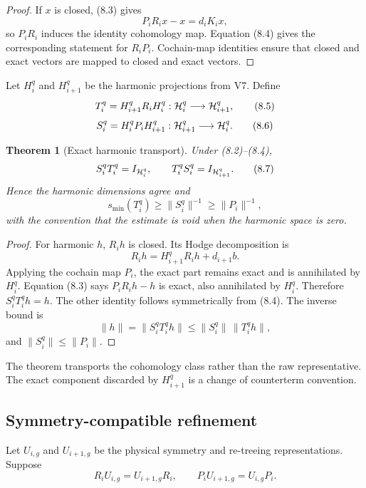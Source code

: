 \documentclass[11pt]{article}
\newtheorem{theorem}{Theorem}[section]
\theoremstyle{remark}
\begin{document}
\begin{proof}
If \(x\) is closed, (8.3) gives
\[
                              P_iR_ix-x=d_iK_ix,
\]
so \(P_iR_i\) induces the identity cohomology map.  Equation (8.4)
gives the corresponding statement for \(R_iP_i\).  Cochain-map
identities ensure that closed and exact vectors are mapped to closed
and exact vectors.
\end{proof}

Let \(H_i^q\) and \(H_{i+1}^q\) be the harmonic projections from V7.
Define
\[
 T_i^q=H_{i+1}^qR_iH_i^q:
       {\cal H}_i^q\longrightarrow{\cal H}_{i+1}^q,          \tag{8.5}
\]
\[
 S_i^q=H_i^qP_iH_{i+1}^q:
       {\cal H}_{i+1}^q\longrightarrow{\cal H}_i^q.          \tag{8.6}
\]

\begin{theorem}[Exact harmonic transport]
\label{thm:v12v8-harmonic}
Under (8.2)--(8.4),
\[
                              S_i^qT_i^q=I_{{\cal H}_i^q},
 \qquad
                              T_i^qS_i^q=I_{{\cal H}_{i+1}^q}.\tag{8.7}
\]
Hence the harmonic dimensions agree and
\[
                  s_{\min}(T_i^q)\ge\|S_i^q\|^{-1}
                                      \ge\|P_i\|^{-1},       \tag{8.8}
\]
with the convention that the estimate is void when the harmonic
space is zero.
\end{theorem}

\begin{proof}
For harmonic \(h\), \(R_ih\) is closed.  Its Hodge decomposition is
\[
                              R_ih=H_{i+1}^qR_ih+d_{i+1}b.
\]
Applying the cochain map \(P_i\), the exact part remains exact and is
annihilated by \(H_i^q\).  Equation (8.3) says
\(P_iR_ih-h\) is exact, also annihilated by \(H_i^q\).  Therefore
\(S_i^qT_i^qh=h\).  The other identity follows symmetrically from
(8.4).  The inverse bound is
\[
 \|h\|=\|S_i^qT_i^qh\|
 \le\|S_i^q\|\,\|T_i^qh\|,
\]
and \(\|S_i^q\|\le\|P_i\|\).
\end{proof}

The theorem transports the cohomology class rather than the raw
representative.  The exact component discarded by \(H_{i+1}^q\) is a
change of counterterm convention.

\subsection{Symmetry-compatible refinement}

Let \(U_{i,g}\) and \(U_{i+1,g}\) be the physical symmetry and
re-treeing representations.  Suppose
\[
                         R_iU_{i,g}=U_{i+1,g}R_i,\qquad
                         P_iU_{i+1,g}=U_{i,g}P_i.            \tag{8.9}
\]
\end{document}
